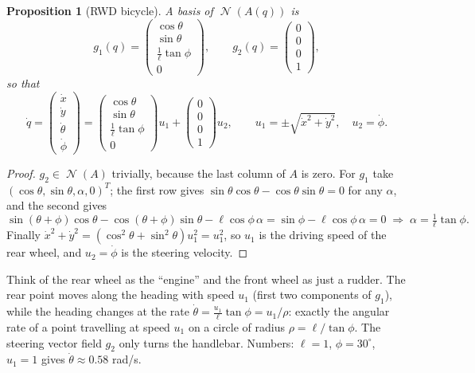 \documentclass[11pt,a4paper]{article}
\DeclareMathOperator{\Ker}{\mathcal{N}}
\theoremstyle{plain}
\newtheorem{proposition}[theorem]{Proposition}
\theoremstyle{definition}
\theoremstyle{remark}
\begin{document}
\begin{proposition}[RWD bicycle]
\label{prop:rwd}
A basis of $\Ker(A(q))$ is
\[
g_1(q)=\begin{pmatrix}\cos\theta\\ \sin\theta\\ \frac1\ell\tan\phi\\ 0\end{pmatrix},\qquad
g_2(q)=\begin{pmatrix}0\\0\\0\\1\end{pmatrix},
\]
so that
\[
\dot q=\begin{pmatrix}\dot x\\\dot y\\\dot\theta\\\dot\phi\end{pmatrix}
=\begin{pmatrix}\cos\theta\\ \sin\theta\\ \frac1\ell\tan\phi\\ 0\end{pmatrix}u_1
+\begin{pmatrix}0\\0\\0\\1\end{pmatrix}u_2,
\qquad u_1=\pm\sqrt{\dot x^2+\dot y^2},\quad u_2=\dot\phi .
\]
\end{proposition}
\begin{proof}
$g_2\in\Ker(A)$ trivially, because the last column of $A$ is zero. For $g_1$ take $(\cos\theta,\sin\theta,\alpha,0)^T$; the first row gives $\sin\theta\cos\theta-\cos\theta\sin\theta=0$ for any $\alpha$, and the second gives
\[
\sin(\theta+\phi)\cos\theta-\cos(\theta+\phi)\sin\theta-\ell\cos\phi\,\alpha=\sin\phi-\ell\cos\phi\,\alpha=0
\;\Longrightarrow\;\alpha=\tfrac1\ell\tan\phi .
\]
Finally $\dot x^2+\dot y^2=(\cos^2\theta+\sin^2\theta)u_1^2=u_1^2$, so $u_1$ is the driving speed of the rear wheel, and $u_2=\dot\phi$ is the steering velocity.
\end{proof}

\begin{intuition}
Think of the rear wheel as the ``engine'' and the front wheel as just a rudder. The rear point moves along the heading with speed $u_1$ (first two components of $g_1$), while the heading changes at the rate $\dot\theta=\frac{u_1}{\ell}\tan\phi=u_1/\rho$: exactly the angular rate of a point travelling at speed $u_1$ on a circle of radius $\rho=\ell/\tan\phi$. The steering vector field $g_2$ only turns the handlebar. Numbers: $\ell=1$, $\phi=30^\circ$, $u_1=1$ gives $\dot\theta\approx0.58$ rad/s.
\end{intuition}
\end{document}
